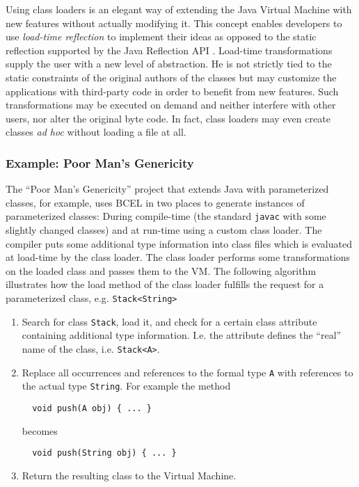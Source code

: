 \documentclass[12pt,twoside]{article}
\newcommand\jc{{\sffamily BCEL }}
\newcommand\jvm{{Java Virtual Machine }}
\begin{document}
Using class loaders  is an elegant way of extending  the \jvm with new
features  without   actually  modifying  it.    This  concept  enables
developers to use \emph{load-time reflection} to implement their ideas
as opposed to  the static reflection supported by  the Java Reflection
API \cite{reflection}.  Load-time transformations supply the user with
a new  level of abstraction.   He is not  strictly tied to  the static
constraints of the  original authors of the classes  but may customize
the applications  with third-party code  in order to benefit  from new
features. Such  transformations may be executed on  demand and neither
interfere with other users, nor alter the original byte code. In fact,
class loaders may even create  classes \emph{ad hoc} without loading a
file at all.

\subsubsection{Example: Poor Man's Genericity}

The  ``Poor Man's  Genericity'' project  \cite{pmg} that  extends Java
with parameterized  classes, for  example, uses \jc  in two  places to
generate instances of  parameterized classes: During compile-time (the
standard  \texttt{javac} with  some slightly  changed classes)  and at
run-time  using  a  custom  class  loader.   The  compiler  puts  some
additional  type information into  class files  which is  evaluated at
load-time  by  the  class  loader.   The class  loader  performs  some
transformations on  the loaded  class and passes  them to the  VM. The
following  algorithm illustrates  how  the load  method  of the  class
loader   fulfills    the   request   for    a   parameterized   class,
e.g. \verb|Stack<String>|

\begin{enumerate}
\item  Search for  class  \texttt{Stack},  load it,  and  check for  a
certain class  attribute containing additional  type information. I.e.
the   attribute   defines   the    ``real''   name   of   the   class,
i.e. \verb|Stack<A>|.

\item  Replace  all  occurrences  and  references to  the  formal  type
\texttt{A}  with references  to the  actual type  \texttt{String}. For
example the method

\begin{verbatim}
  void push(A obj) { ... }
\end{verbatim}

becomes

\begin{verbatim}
  void push(String obj) { ... }
\end{verbatim}

\item Return the resulting class to the Virtual Machine.
\end{enumerate}



\newpage\appendix

\pagestyle{empty}


\end{document}
